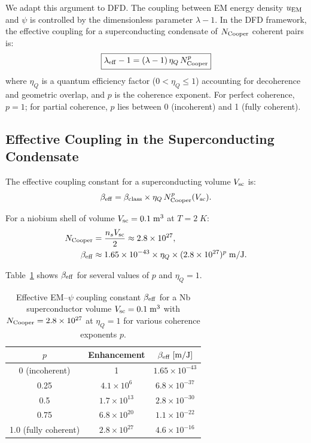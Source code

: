 \documentclass[twocolumn,prl,superscriptaddress,nofootinbib,longbibliography,floatfix]{revtex4-2}
\begin{document}
We adapt this argument to DFD.  The coupling between EM energy density
$u_{\rm EM}$ and $\psi$ is controlled by the dimensionless parameter
$\lambda - 1$.  In the DFD framework, the effective coupling for a
superconducting condensate of $N_{\rm Cooper}$ coherent pairs is:
\begin{equation}
\boxed{
\lambda_{\rm eff} - 1 = (\lambda - 1)\,\eta_Q\,N_{\rm Cooper}^p
}
\label{eq:lambda-eff}
\end{equation}
where $\eta_Q$ is a quantum efficiency factor ($0 < \eta_Q \leq 1$)
accounting for decoherence and geometric overlap, and $p$ is the
coherence exponent.  For perfect coherence, $p = 1$; for partial
coherence, $p$ lies between 0 (incoherent) and 1 (fully coherent).

\subsection{Effective Coupling in the Superconducting Condensate}

The effective coupling constant for a superconducting volume $V_{\rm sc}$
is:
\begin{equation}
\beta_{\rm eff} = \beta_{\rm class} \times
\eta_Q\,N_{\rm Cooper}^p(V_{\rm sc}).
\label{eq:beta-eff}
\end{equation}

For a niobium shell of volume $V_{\rm sc} = 0.1\;\si{m^3}$ at
$T = 2\;\si{K}$:
\begin{align}
N_{\rm Cooper} &= \frac{n_s V_{\rm sc}}{2}
\approx 2.8 \times 10^{27}, \\
\beta_{\rm eff} &\approx 1.65 \times 10^{-43}
\times \eta_Q \times (2.8 \times 10^{27})^p\;\si{m/J}.
\end{align}

Table~\ref{tab:enhancement} shows $\beta_{\rm eff}$ for several values
of $p$ and $\eta_Q = 1$.

\begin{table}[h]
\centering
\caption{Effective EM--$\psi$ coupling constant
$\beta_{\rm eff}$ for a Nb superconductor volume
$V_{\rm sc} = 0.1\;\si{m^3}$ with $N_{\rm Cooper} = 2.8 \times 10^{27}$
at $\eta_Q = 1$ for various coherence exponents $p$.}
\label{tab:enhancement}
\begin{ruledtabular}
\begin{tabular}{ccc}
$p$ & Enhancement & $\beta_{\rm eff}\;[\si{m/J}]$ \\
\hline
0 (incoherent) & 1 & $1.65 \times 10^{-43}$ \\
0.25 & $4.1 \times 10^{6}$ & $6.8 \times 10^{-37}$ \\
0.5  & $1.7 \times 10^{13}$ & $2.8 \times 10^{-30}$ \\
0.75 & $6.8 \times 10^{20}$ & $1.1 \times 10^{-22}$ \\
1.0 (fully coherent) & $2.8 \times 10^{27}$ &
$4.6 \times 10^{-16}$ \\
\end{tabular}
\end{ruledtabular}
\end{table}
\end{document}
